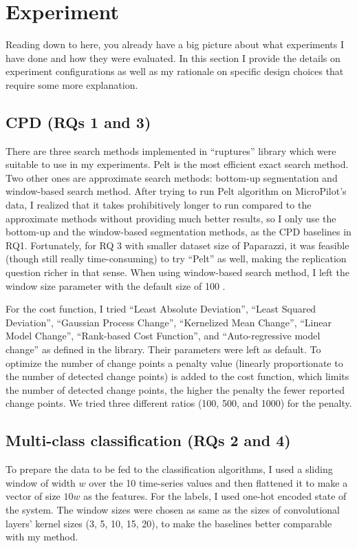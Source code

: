 \section{Experiment}
Reading down to here, you already have a big picture about what experiments I have done and how they were evaluated.
In this section I provide the details on experiment configurations as well as my rationale on specific design choices that require some more explanation.

\subsection{CPD (RQs 1 and 3)}
There are three search methods implemented in ``ruptures'' library which were suitable to use in my experiments. Pelt \cite{killick2012optimal} is the most efficient exact search method. Two other ones are approximate search methods: bottom-up segmentation and window-based search method. 
After trying to run Pelt algorithm on MicroPilot's data, I realized that it takes prohibitively longer to run compared to the approximate methods without providing much better results, so I only use the bottom-up and the window-based segmentation methods, as the CPD baselines in RQ1.
Fortunately, for RQ 3 with smaller dataset size of Paparazzi, it was feasible (though still really time-consuming) to try ``Pelt'' as well, making the replication question richer in that sense.
When using window-based search method, I left the window size parameter with the default size of 100 \cite{keogh2001online}.

For the cost function, I tried ``Least Absolute Deviation'', ``Least Squared Deviation'', ``Gaussian Process Change'', ``Kernelized Mean Change'', ``Linear Model Change'', ``Rank-based Cost Function'', and ``Auto-regressive model change'' as defined in the library. Their parameters were left as default.
To optimize the number of change points a penalty value (linearly proportionate to the number of detected change points) is added to the cost function, which limits the number of detected change points, the higher the penalty the fewer reported change points. We tried three different ratios (100, 500, and 1000) for the penalty.


\subsection{Multi-class classification (RQs 2 and 4)}
To prepare the data to be fed to the classification algorithms, I used a sliding window of width $w$ over the 10 time-series values and then flattened it to make a vector of size $10w$ as the features. For the labels, I used one-hot encoded state of the system.
The window sizes were chosen as same as the sizes of convolutional layers' kernel sizes (3, 5, 10, 15, 20), to make the baselines better comparable with my method. 

